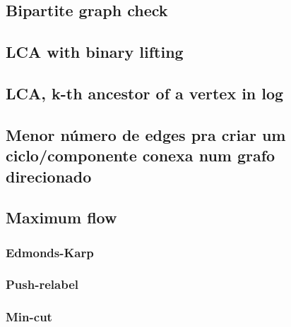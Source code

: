 \subsection{Bipartite graph check}


\subsection{LCA with binary lifting}


\subsection{LCA, k-th ancestor of a vertex in log}


\subsection{Menor número de edges pra criar um ciclo/componente conexa num grafo direcionado}


\subsection{Maximum flow}

\subsubsection{Edmonds-Karp}


\subsubsection{Push-relabel}


\subsubsection{Min-cut}

